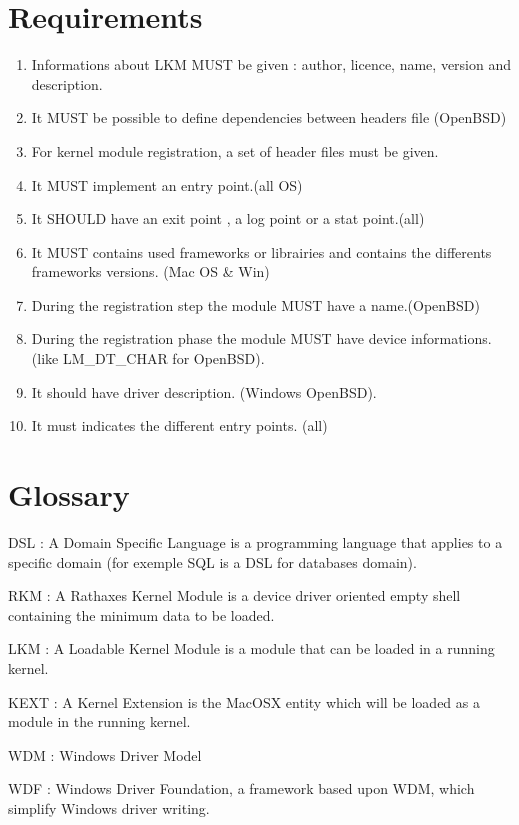 \documentclass[11pt]{report}
\begin{document}
\section{Requirements}
\begin{enumerate}
	\item Informations about LKM MUST be given : author, licence, name, version and description.
  	\item It MUST be possible to define dependencies between headers file (OpenBSD) 
	\item For kernel module registration, a set of header files must be given.
	\item It MUST implement an entry point.(all OS)
	\item It SHOULD have an exit point , a log point or a stat point.(all)
	\item It MUST contains used frameworks or librairies and contains the differents frameworks versions. (Mac OS \& Win)
	\item During the registration step the module MUST have a name.(OpenBSD) 
	\item During the registration phase the module MUST have device informations.(like LM\_DT\_CHAR for OpenBSD).
	\item It should have driver description. (Windows OpenBSD).
	\item It must indicates the different entry points. (all)
\end{enumerate}
\newpage
\section{Glossary}
\begin{description}
	\label{DSL}
	\item{DSL : A Domain Specific Language is a programming language that
        applies to a specific domain (for exemple SQL is a DSL for databases
        domain).}
	\label{RKM}
	\item{RKM : A Rathaxes Kernel Module is a device driver oriented empty shell 
	containing the minimum data to be loaded.}
	\label{LKM}
	\item{LKM : A Loadable Kernel Module is a module that can be loaded in a running kernel.}
	\label{KEXT}
	\item{KEXT : A Kernel Extension is the MacOSX entity which will be loaded as a module in the running kernel.}
	\label{WDM}
	\item{WDM : Windows Driver Model}
	\label{WDF}
	\item{WDF : Windows Driver Foundation, a framework based upon WDM, which simplify Windows driver writing.}
\end{description}
\end{document}
